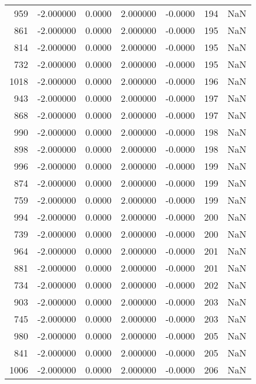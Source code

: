 \begin{tabular}{rrrrrrr}
 959 &   -2.000000 &    0.0000 &    2.000000 &     -0.0000 &         194 & NaN \\
 861 &   -2.000000 &    0.0000 &    2.000000 &     -0.0000 &         195 & NaN \\
 814 &   -2.000000 &    0.0000 &    2.000000 &     -0.0000 &         195 & NaN \\
 732 &   -2.000000 &    0.0000 &    2.000000 &     -0.0000 &         195 & NaN \\
1018 &   -2.000000 &    0.0000 &    2.000000 &     -0.0000 &         196 & NaN \\
 943 &   -2.000000 &    0.0000 &    2.000000 &     -0.0000 &         197 & NaN \\
 868 &   -2.000000 &    0.0000 &    2.000000 &     -0.0000 &         197 & NaN \\
 990 &   -2.000000 &    0.0000 &    2.000000 &     -0.0000 &         198 & NaN \\
 898 &   -2.000000 &    0.0000 &    2.000000 &     -0.0000 &         198 & NaN \\
 996 &   -2.000000 &    0.0000 &    2.000000 &     -0.0000 &         199 & NaN \\
 874 &   -2.000000 &    0.0000 &    2.000000 &     -0.0000 &         199 & NaN \\
 759 &   -2.000000 &    0.0000 &    2.000000 &     -0.0000 &         199 & NaN \\
 994 &   -2.000000 &    0.0000 &    2.000000 &     -0.0000 &         200 & NaN \\
 739 &   -2.000000 &    0.0000 &    2.000000 &     -0.0000 &         200 & NaN \\
 964 &   -2.000000 &    0.0000 &    2.000000 &     -0.0000 &         201 & NaN \\
 881 &   -2.000000 &    0.0000 &    2.000000 &     -0.0000 &         201 & NaN \\
 734 &   -2.000000 &    0.0000 &    2.000000 &     -0.0000 &         202 & NaN \\
 903 &   -2.000000 &    0.0000 &    2.000000 &     -0.0000 &         203 & NaN \\
 745 &   -2.000000 &    0.0000 &    2.000000 &     -0.0000 &         203 & NaN \\
 980 &   -2.000000 &    0.0000 &    2.000000 &     -0.0000 &         205 & NaN \\
 841 &   -2.000000 &    0.0000 &    2.000000 &     -0.0000 &         205 & NaN \\
1006 &   -2.000000 &    0.0000 &    2.000000 &     -0.0000 &         206 & NaN \\

\end{tabular}
